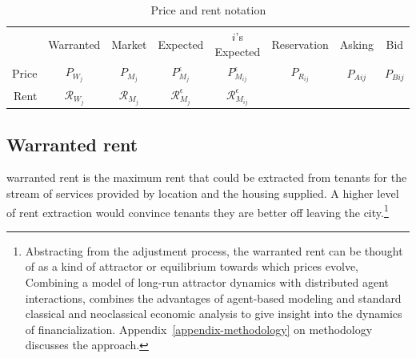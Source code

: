 \begin{table}[!ht]
\centering
{\renewcommand{\arraystretch}{1.6}
\begin{tabular}{r|c|c|c|c|c|c|c|}\cline{2-8}
       & Warranted  & Market & Expected & $i$'s Expected & Reservation & Asking & Bid     \\ \cline{2-8}
Price  & $P_{W_j}$      & $P_{M_j}$  & $P_{M_j}^\epsilon$ & $P_{M_{ij}}^{\epsilon}$     & $P_{R_{ij}}$       & $P_{A{ij}}$  & $P_{B{ij}}$   \\ \cline{2-8}
Rent  & $\mathcal{R}_{W_j}$      & $\mathcal{R}_{M_j}$  & $\mathcal{R}_{M_j}^\epsilon$ & $\mathcal{R}_{M_{ij}}^{\epsilon}$     &       &   &   \\ \cline{2-8}
\end{tabular}
 }   

\caption{Price and rent notation}
\label{table-price-notation}
\end{table}




\subsection{Warranted rent}\label{sec:warranted-rent}
\Gls{warranted rent} is the maximum rent that could be extracted from tenants for the stream of services provided by location and the housing supplied. A higher level of rent extraction would convince tenants they are better off leaving the city.\footnote{Abstracting from the adjustment process, the warranted rent can be thought of as a kind of \gls{attractor} or \gls{equilibrium} towards which prices evolve,  %
Combining a model of long-run attractor dynamics with distributed agent interactions, combines the advantages of agent-based modeling and standard \gls{classical} and \gls{neoclassical} economic analysis to give insight into the dynamics of financialization. Appendix~\ref{appendix-methodology} on methodology discusses the approach.} 


